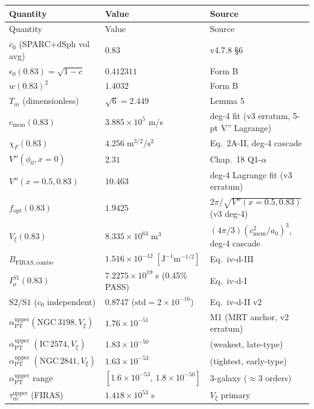 \documentclass[11pt,a4paper]{article}
\newcommand{\epso}{\epsilon_0}
\newcommand{\cmem}{c_{\mathrm{mem}}}
\newcommand{\Vxi}{V_{\xi}}
\newcommand{\Tm}{T_{m}}
\newcommand{\aPT}{\alpha_{\mathrm{PT}}}
\newcommand{\taum}{\tau_{m}}
\newcommand{\Imu}{I_{\mu}}
\newcommand{\BFIRAS}{B_{\mathrm{FIRAS,combo}}}
\newcommand{\Lambdauv}{\Lambda_{\mathrm{UV}}}
\newcommand{\fopt}{f_{\mathrm{opt}}}
\begin{document}
\begin{center}\small
\begin{longtable}{@{}lll@{}}
\toprule
Quantity & Value & Source \\
\midrule\endfirsthead
\toprule
Quantity & Value & Source \\
\midrule\endhead
$c_0$ (SPARC+dSph vol avg) & $0.83$ & v4.7.8 \S 6 \\
$\epso(0.83) = \sqrt{1 - c}$ & $0.412311$ & Form B \\
$w(0.83)^2$ & $1.4032$ & Form B \\
$\Tm$ (dimensionless) & $\sqrt{6} = 2.449$ & Lemma 5~\citep{v476internal} \\
$\cmem(0.83)$ & $3.885 \times 10^{5}$ m/s & deg-4 fit (v3 erratum, 5-pt V'' Lagrange) \\
$\chi_F(0.83)$ & $4.256\;\mathrm{m}^{3/2}/\mathrm{s}^2$ & Eq.~2A-II, deg-4 cascade \\
$V''(\phi_0, x=0)$ & $2.31$ & Chap.~18 Q1-$\alpha$ \\
$V''(x=0.5, 0.83)$ & $10.463$ & deg-4 Lagrange fit (v3 erratum) \\
$\fopt(0.83)$ & $1.9425$ & $2\pi/\sqrt{V''(x=0.5,0.83)}$ (v3 deg-4) \\
$\Vxi(0.83)$ & $8.335 \times 10^{63}\;\mathrm{m}^3$ & $(4\pi/3)(\cmem^2/a_0)^3$, deg-4 cascade \\
$\BFIRAS$ & $1.516 \times 10^{-12}\;[\mathrm{J}^{-1}\mathrm{m}^{-1/2}]$ & Eq.~iv-d-III \\
$\Imu^{S1}(0.83)$ & $7.2275 \times 10^{19}$ s (0.45\% PASS) & Eq.~iv-d-I \\
$\mathrm{S2/S1}$ ($c_0$ independent) & $0.8747$ ($\mathrm{std} = 2 \times 10^{-16}$) & Eq.~iv-d-II v2 \\
$\aPT^{\mathrm{upper}}(\mathrm{NGC\,3198}, \Vxi)$ & $1.76 \times 10^{-51}$ & M1 (MRT anchor, v2 erratum) \\
$\aPT^{\mathrm{upper}}\;(\mathrm{IC\,2574}, \Vxi)$ & $1.83 \times 10^{-50}$ & (weakest, late-type) \\
$\aPT^{\mathrm{upper}}\;(\mathrm{NGC\,2841}, \Vxi)$ & $1.63 \times 10^{-53}$ & (tightest, early-type) \\
$\aPT^{\mathrm{upper}}$ range & $[1.6\times10^{-53},\, 1.8\times10^{-50}]$ & 3-galaxy ($\approx$3 orders) \\
$\taum^{\mathrm{upper}}$ (FIRAS) & $1.418 \times 10^{53}$ s & $\Vxi$ primary \\

\end{longtable}
\end{center}
\end{document}
